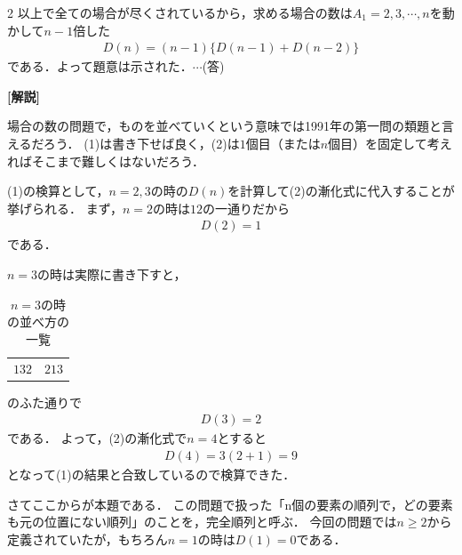 \documentclass[../../main.tex]{subfiles}
\begin{document}
\begin{multicols}{2}
  以上で全ての場合が尽くされているから，求める場合の数は$A_1=2,3,\cdots, n$を動かして$n-1$倍した
  \begin{align}
    D(n) = (n-1) \{ D(n-1) + D(n-2) \}
  \end{align}
  である．よって題意は示された．$\cdots$(答)

  {\bf [解説]}

  場合の数の問題で，ものを並べていくという意味では1991年の第一問の類題と言えるだろう．
  (1)は書き下せば良く，(2)は$1$個目（または$n$個目）を固定して考えればそこまで難しくはないだろう．

  (1)の検算として，$n=2,3$の時の$D(n)$を計算して(2)の漸化式に代入することが挙げられる．
  まず，$n=2$の時は$12$の一通りだから
  \begin{align}
    D(2) = 1
  \end{align}
  である．

  $n=3$の時は実際に書き下すと，
  \begin{table}[H]
    \centering
    \caption{$n=3$の時の並べ方の一覧}
    \begin{tabular}{cc}
      $132$ & $213$
    \end{tabular}
  \end{table}
  のふた通りで
  \begin{align}
    D(3) = 2
  \end{align}
  である．
  よって，(2)の漸化式で$n=4$とすると
  \begin{align}
    D(4) = 3\left(2+1\right) = 9
  \end{align}
  となって(1)の結果と合致しているので検算できた．

  さてここからが本題である．
  この問題で扱った「n個の要素の順列で，どの要素も元の位置にない順列」のことを，完全順列と呼ぶ．
  今回の問題では$n\ge 2$から定義されていたが，もちろん$n=1$の時は$D(1)=0$である．


\end{multicols}
\end{document}
